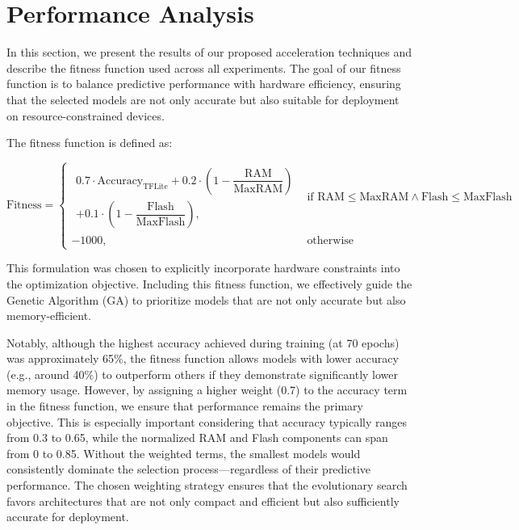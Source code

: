 \chapter{Performance Analysis}

In this section, we present the results of our proposed acceleration techniques and describe the fitness function used across all experiments. The goal of our fitness function is to balance predictive performance with hardware efficiency, ensuring that the selected models are not only accurate but also suitable for deployment on resource-constrained devices.

The fitness function is defined as:

\begin{equation}
\text{Fitness} =
\begin{cases}
\begin{aligned}
0.7 \cdot \text{Accuracy}_{\text{TFLite}} 
+ 0.2 \cdot \left(1 - \dfrac{\text{RAM}}{\text{MaxRAM}}\right) \\
+ 0.1 \cdot \left(1 - \dfrac{\text{Flash}}{\text{MaxFlash}}\right),
\end{aligned}
& \text{if } \text{RAM} \leq \text{MaxRAM} \land \text{Flash} \leq \text{MaxFlash} \\
-1000, & \text{otherwise}
\end{cases}
\label{eq:fitness_function}
\end{equation}



This formulation was chosen to explicitly incorporate hardware constraints into the optimization objective. Including this fitness function, we effectively guide the Genetic Algorithm (GA) to prioritize models that are not only accurate but also memory-efficient.

Notably, although the highest accuracy achieved during training (at 70 epochs) was approximately 65\%, the fitness function allows models with lower accuracy (e.g., around 40\%) to outperform others if they demonstrate significantly lower memory usage. However, by assigning a higher weight (0.7) to the accuracy term in the fitness function, we ensure that performance remains the primary objective. This is especially important considering that accuracy typically ranges from 0.3 to 0.65, while the normalized RAM and Flash components can span from 0 to 0.85. Without the weighted terms, the smallest models would consistently dominate the selection process—regardless of their predictive performance. The chosen weighting strategy ensures that the evolutionary search favors architectures that are not only compact and efficient but also sufficiently accurate for deployment.

